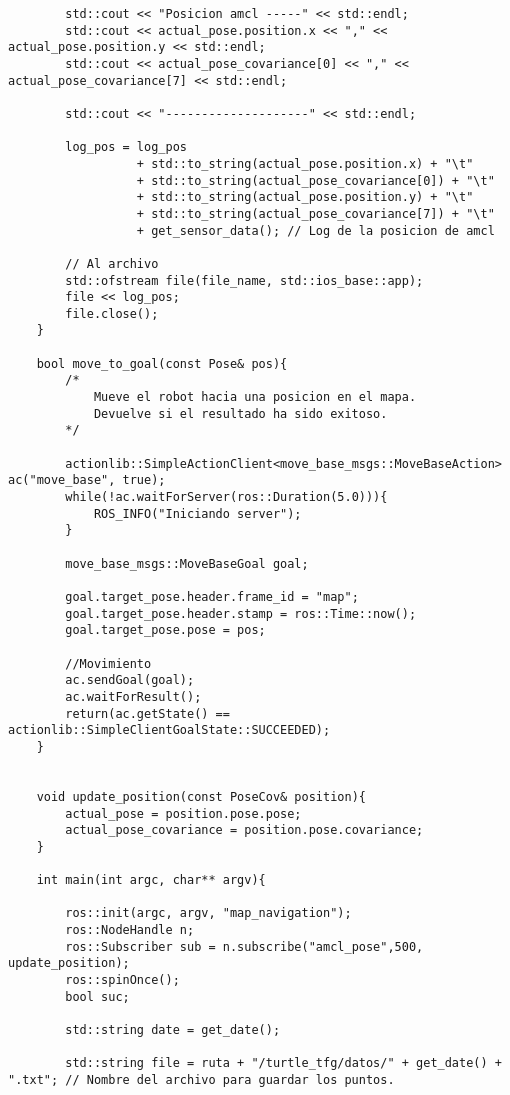 \begin{lstlisting}
        std::cout << "Posicion amcl -----" << std::endl;
        std::cout << actual_pose.position.x << "," << actual_pose.position.y << std::endl;
        std::cout << actual_pose_covariance[0] << "," << actual_pose_covariance[7] << std::endl;
    
        std::cout << "--------------------" << std::endl;
    
        log_pos = log_pos
                  + std::to_string(actual_pose.position.x) + "\t"
                  + std::to_string(actual_pose_covariance[0]) + "\t"
                  + std::to_string(actual_pose.position.y) + "\t"
                  + std::to_string(actual_pose_covariance[7]) + "\t"
                  + get_sensor_data(); // Log de la posicion de amcl
    
        // Al archivo
        std::ofstream file(file_name, std::ios_base::app);
        file << log_pos;
        file.close();
    }
    
    bool move_to_goal(const Pose& pos){
        /*
            Mueve el robot hacia una posicion en el mapa.
            Devuelve si el resultado ha sido exitoso.
        */
        
        actionlib::SimpleActionClient<move_base_msgs::MoveBaseAction> ac("move_base", true);
        while(!ac.waitForServer(ros::Duration(5.0))){
            ROS_INFO("Iniciando server");
        }
        
        move_base_msgs::MoveBaseGoal goal;
        
        goal.target_pose.header.frame_id = "map";
        goal.target_pose.header.stamp = ros::Time::now();
        goal.target_pose.pose = pos;
    
        //Movimiento
        ac.sendGoal(goal);
        ac.waitForResult();
        return(ac.getState() == actionlib::SimpleClientGoalState::SUCCEEDED);
    }
    
    
    void update_position(const PoseCov& position){
        actual_pose = position.pose.pose;
        actual_pose_covariance = position.pose.covariance;
    }
    
    int main(int argc, char** argv){
    
        ros::init(argc, argv, "map_navigation");
        ros::NodeHandle n;
        ros::Subscriber sub = n.subscribe("amcl_pose",500, update_position);
        ros::spinOnce();
        bool suc;
    
        std::string date = get_date();
    
        std::string file = ruta + "/turtle_tfg/datos/" + get_date() + ".txt"; // Nombre del archivo para guardar los puntos.
    

\end{lstlisting}
